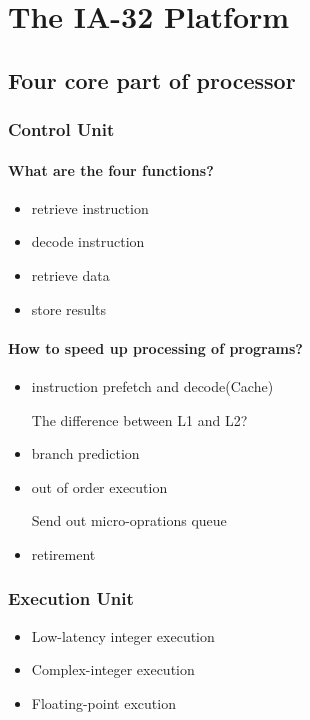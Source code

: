 \chapter{The IA-32 Platform}
\section{Four core part of processor}
\subsection{Control Unit}
\subsubsection{What are the four functions?}
\begin{itemize}
    \item retrieve instruction
    \item decode instruction
    \item retrieve data
    \item store results
\end{itemize}
\subsubsection{How to speed up processing of programs?}
\begin{itemize}
    \item instruction prefetch and decode(Cache)

The difference between L1 and L2?
    \item branch prediction
    \item out of order execution

Send out micro-oprations queue
    \item retirement
\end{itemize}
\subsection{Execution Unit}
\begin{itemize}
    \item Low-latency integer execution
    \item Complex-integer execution
    \item Floating-point excution
\end{itemize}
